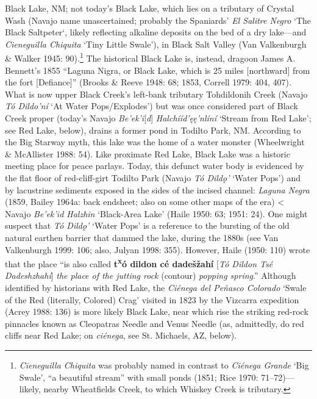 Black Lake, NM; not today’s Black Lake, which lies on a tributary of Crystal Wash (Navajo name unascertained; probably the Spaniards’ \textit{El Salitre Negro} ‘The Black Saltpeter‘, likely reflecting alkaline deposits on the bed of a dry lake—and \textit{Cieneguilla Chiquita} ‘Tiny Little Swale’), in Black Salt Valley (Van Valkenburgh \& Walker 1945: 90).\footnote{\textit{Cieneguilla Chiquita} was probably named in contrast to \textit{Ciénega Grande} ‘Big Swale’, “a beautiful stream” with small ponds (1851; Rice 1970: 71–72)---likely, nearby Wheatfields Creek, to which Whiskey Creek is tributary.}  The historical Black Lake is, instead, dragoon James A. Bennett’s 1855 “Laguna Nigra, or Black Lake, which is 25 miles [northward] from the fort [Defiance]” (Brooks \& Reeve 1948: 68; 1853, Correll 1979: 404, 407).  What is now upper Black Creek’s left-bank tributary Tohdildonih Creek (Navajo \textit{Tó Dildo’ní} ‘At Water Pops/Explodes’) but was once considered part of Black Creek proper (today’s Navajo \textit{Be’ek’i}[\textit{d}] \textit{Halchííd’ęę’nlíní} ‘Stream from Red Lake’; see Red Lake, below), drains a former pond in Todilto Park, NM.  According to the Big Starway myth, this lake was the home of a water monster (Wheelwright \& McAllister 1988: 54).  Like proximate Red Lake, Black Lake was a historic meeting place for peace parlays.  Today, this defunct water body is evidenced by the flat floor of red-cliff-girt Todilto Park (Navajo \textit{Tó Dildǫ’} ‘Water Pops’) and by lacustrine sediments exposed in the sides of the incised channel:  \textit{Laguna Negra} (1859, Bailey 1964a: back endsheet; also on some other maps of the era) {\textless} Navajo \textit{Be’ek’id  Halzhin} ‘Black-Area Lake’ (Haile 1950: 63; 1951: 24).  One might suspect that \textit{Tó Dildǫ’} ‘Water Pops’ is a reference to the bursting of the old natural earthen barrier that dammed the lake, during the 1880s (see Van Valkenburgh 1999: 106; also, Julyan 1998: 355).  However, Haile (1950: 110) wrote that the place “is also called \textbf{t}\textbf{\textsuperscript{x}}\textbf{ó dildon cé dadešžahí }[\textit{Tó Dildon Tsé Dadeshzhahí}] \textit{the place of the jutting rock} (contour) \textit{popping spring}.”  Although identified by historians with Red Lake, the \textit{Ciénega del Peñasco Colorado} ‘Swale of the Red (literally, Colored) Crag’ visited in 1823 by the Vizcarra expedition (Acrey 1988: 136) is more likely Black Lake, near which rise the striking red-rock pinnacles known as Cleopatras Needle and Venus Needle (as, admittedly, do red cliffs near Red Lake; on \textit{ciénega}, see St. Michaels, AZ, below).

